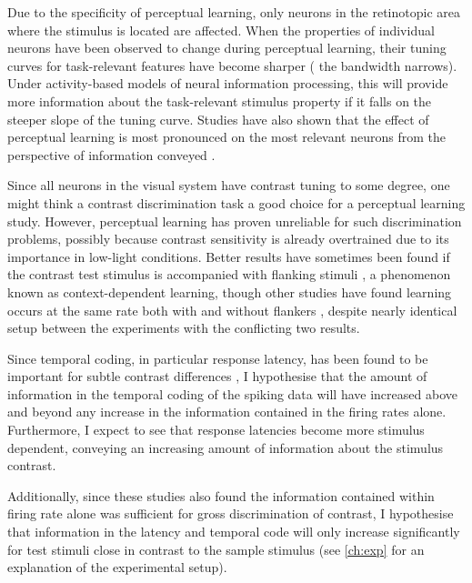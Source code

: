 Due to the specificity of perceptual learning, only neurons in the retinotopic area where the stimulus is located are affected.
When the properties of individual neurons have been observed to change during perceptual learning, their tuning curves for task-relevant features have become sharper (\ie{} the bandwidth narrows).
Under activity-based models of neural information processing, this will provide more information about the task-relevant stimulus property if it falls on the steeper slope of the tuning curve.
Studies have also shown that the effect of perceptual learning is most pronounced on the most relevant neurons from the perspective of information conveyed \citep{Raiguel2006}.



Since all neurons in the visual system have contrast tuning to some degree, one might think a contrast discrimination task a good choice for a perceptual learning study.
However, perceptual learning has proven unreliable for such discrimination problems, possibly because contrast sensitivity is already overtrained due to its importance in low-light conditions.
Better results have sometimes been found if the contrast test stimulus is accompanied with flanking stimuli \citep{Adini2002}, a phenomenon known as context-dependent learning, though other studies have found learning occurs at the same rate both with and without flankers \citep{Yu2004}, despite nearly identical setup between the experiments with the conflicting two results.

Since temporal coding, in particular response latency, has been found to be important for subtle contrast differences \citep{Reich2001,Arabzadeh2006}, I hypothesise that the amount of information in the temporal coding of the spiking data will have increased above and beyond any increase in the information contained in the firing rates alone.
Furthermore, I expect to see that response latencies become more stimulus dependent, conveying an increasing amount of information about the stimulus contrast.

Additionally, since these studies \citep{Reich2001,Arabzadeh2006} also found the information contained within firing rate alone was sufficient for gross discrimination of contrast, I hypothesise that information in the latency and temporal code will only increase significantly for test stimuli close in contrast to the sample stimulus (see \autoref{ch:exp} for an explanation of the experimental setup).

